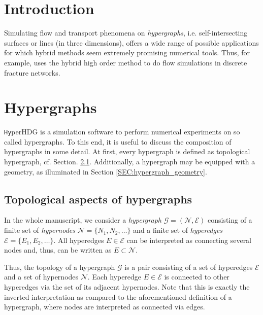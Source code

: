 \documentclass[a4paper, english, 12pt, reqno, draft]{amsart}
\theoremstyle{definition}
\theoremstyle{remark}
\numberwithin{equation}{section}
\newcommand{\hyperHDG}{{\fontfamily{pzc}\selectfont \texttt{Hy}\hspace{-1.5pt}perHDG }}
\newcommand{\graph}{\ensuremath{\mathcal G}}
\newcommand{\setEdge}{\ensuremath{\mathcal E}}
\newcommand{\setNode}{\ensuremath{\mathcal N}}
\newcommand{\edge}{\ensuremath{E}}
\newcommand{\node}{\ensuremath{N}}
\begin{document}
\section{Introduction}
% 
Simulating flow and transport phenomena on \emph{hypergraphs}, i.e. self-intersecting surfaces or lines (in three dimensions), offers a wide range of possible applications for which hybrid methods seem extremely promising numerical tools. Thus, for example, \cite{HedinPE2019} uses the hybrid high order method to do flow simulations in discrete fracture networks.
% 
\section{Hypergraphs}\label{SEC:hypergraph}
% 
\hyperHDG is a simulation software to perform numerical experiments on so called hypergraphs. To this end, it is useful to discuss the composition of hypergraphs in some detail. At first, every hypergraph is defined as topological hypergraph, cf. Section. \ref{SEC:hypergraph_topology}. Additionally, a hypergraph may be equipped with a geometry, as illuminated in Section \ref{SEC:hypergraph_geometry}. 
% 
\subsection{Topological aspects of hypergraphs}\label{SEC:hypergraph_topology}
% 
In the whole manuscript, we consider a \emph{hypergraph} $\graph = (\setNode,\setEdge)$ consisting of a finite set of \emph{hypernodes} $\setNode = \{\node_1, \node_2, \ldots \}$ and a finite set of \emph{hyperedges} $\setEdge = \{\edge_1, \edge_2, \ldots \}$. All hyperedges $\edge \in \setEdge$ can be interpreted as connecting several nodes and, thus, can be written as $\edge \subset \setNode$.

Thus, the topology of a hypergraph $\graph$ is a pair consisting of a set of hyperedges $\setEdge$ and a set of hypernodes $\setNode$. Each hyperedge $\edge \in \setEdge$ is connected to other hyperedges via the set of its adjacent hypernodes. Note that this is exactly the inverted interpretation as compared to the aforementioned definition of a hypergraph, where nodes are interpreted as connected via edges.
\end{document}
